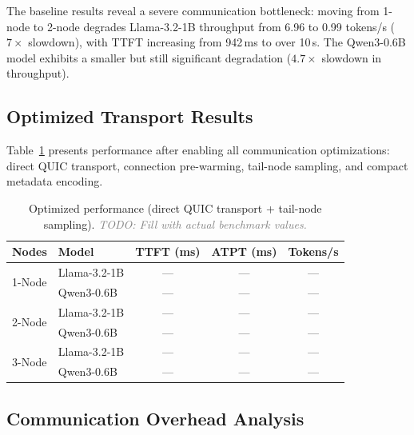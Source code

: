 \documentclass[runningheads]{llncs}
\begin{document}
The baseline results reveal a severe communication bottleneck: moving from 1-node to 2-node degrades Llama-3.2-1B throughput from 6.96 to 0.99 tokens/s ($7\times$ slowdown), with TTFT increasing from 942\,ms to over 10\,s. The Qwen3-0.6B model exhibits a smaller but still significant degradation ($4.7\times$ slowdown in throughput).

\subsection{Optimized Transport Results}
\label{sec:opt_results}

Table~\ref{tab:optimized} presents performance after enabling all communication optimizations: direct QUIC transport, connection pre-warming, tail-node sampling, and compact metadata encoding.

\begin{table}[t]
    \centering
    \caption{Optimized performance (direct QUIC transport + tail-node sampling). \textcolor{gray}{\textit{TODO: Fill with actual benchmark values.}}}
    \label{tab:optimized}
    \begin{tabular}{llccc}
    \toprule
    \textbf{Nodes} & \textbf{Model} & \textbf{TTFT (ms)} & \textbf{ATPT (ms)} & \textbf{Tokens/s} \\
    \midrule
    \multirow{2}{*}{1-Node} & Llama-3.2-1B & --- & --- & --- \\
    & Qwen3-0.6B & --- & --- & --- \\
    \midrule
    \multirow{2}{*}{2-Node} & Llama-3.2-1B & --- & --- & --- \\
    & Qwen3-0.6B & --- & --- & --- \\
    \midrule
    \multirow{2}{*}{3-Node} & Llama-3.2-1B & --- & --- & --- \\
    & Qwen3-0.6B & --- & --- & --- \\
    \bottomrule
    \end{tabular}
\end{table}

\subsection{Communication Overhead Analysis}
\label{sec:comm_analysis}
\end{document}
